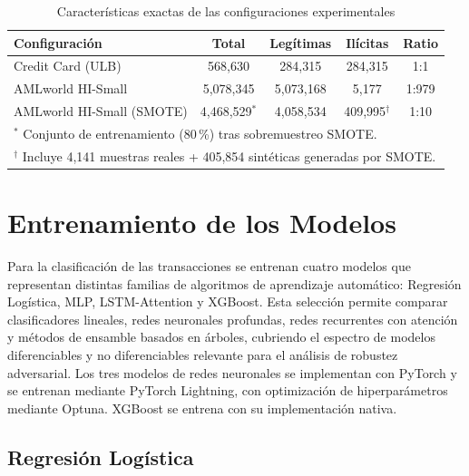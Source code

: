 \begin{table}[H]
\centering
\caption{Características exactas de las configuraciones experimentales}
\label{tab:datasets}
\begin{tabular}{lcccc}
\hline
\textbf{Configuración} & \textbf{Total} & \textbf{Legítimas} & \textbf{Ilícitas} & \textbf{Ratio} \\
\hline
Credit Card (ULB)         & 568{,}630     & 284{,}315     & 284{,}315                    & 1:1   \\
AMLworld HI-Small         & 5{,}078{,}345 & 5{,}073{,}168 & 5{,}177                      & 1:979 \\
AMLworld HI-Small (SMOTE) & 4{,}468{,}529$^*$ & 4{,}058{,}534 & 409{,}995$^\dagger$      & 1:10  \\
\hline
\multicolumn{5}{l}{\footnotesize $^*$ Conjunto de entrenamiento (80\,\%) tras sobremuestreo SMOTE.} \\
\multicolumn{5}{l}{\footnotesize $^\dagger$ Incluye 4{,}141 muestras reales + 405{,}854 sintéticas generadas por SMOTE.} \\
\end{tabular}
\end{table}

\section{Entrenamiento de los Modelos}

Para la clasificación de las transacciones se entrenan cuatro modelos que representan distintas familias de algoritmos de aprendizaje automático: Regresión Logística, MLP, LSTM-Attention y XGBoost. Esta selección permite comparar clasificadores lineales, redes neuronales profundas, redes recurrentes con atención y métodos de ensamble basados en árboles, cubriendo el espectro de modelos diferenciables y no diferenciables relevante para el análisis de robustez adversarial. Los tres modelos de redes neuronales se implementan con PyTorch y se entrenan mediante PyTorch Lightning, con optimización de hiperparámetros mediante Optuna. XGBoost se entrena con su implementación nativa.

\subsection{Regresión Logística}

